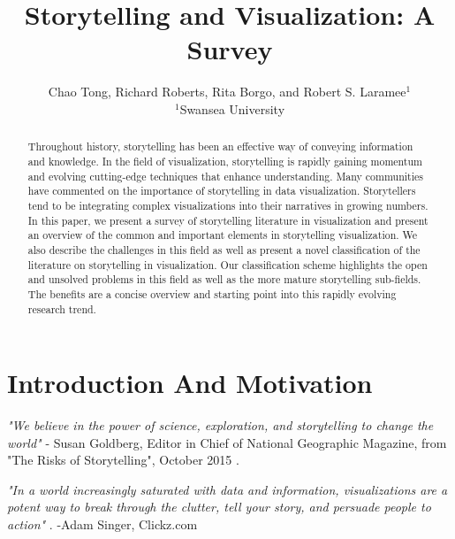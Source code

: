 \documentclass{egpubl}
\begin{document}
\title[Storytelling and Visualization: A Survey]%
      {Storytelling and Visualization: A Survey}

\author[C.Tong \& R.Roberts \& R.S.Laramee]
       {Chao Tong, Richard Roberts, Rita Borgo,
        and Robert S. Laramee$^{1}$

        $^1$Swansea University
       }

\maketitle
\begin{abstract}
Throughout history, storytelling has been an effective way of conveying information and knowledge. In the field of visualization, storytelling is rapidly gaining momentum and evolving cutting-edge techniques that enhance understanding. Many communities have commented on the importance of storytelling in data visualization. Storytellers tend to be integrating complex visualizations into their narratives in growing numbers. In this paper, we present a survey of storytelling literature in visualization and present an overview of the common and important elements in storytelling visualization. We also describe the challenges in this field as well as present a novel classification of the literature on storytelling in visualization. Our classification scheme highlights the open and unsolved problems in this field as well as the more mature storytelling sub-fields. The benefits are a concise overview and starting point into this rapidly evolving research trend.
\end{abstract}
\section{Introduction And Motivation}
\textit{"We believe in the power of science, exploration, and storytelling to change the world"} - Susan Goldberg, Editor in Chief of National Geographic Magazine, from "The Risks of Storytelling", October 2015 \cite{risks2015}. 

\textit{"In a world increasingly saturated with data and information, visualizations are a potent way to break through the clutter, tell your story, and persuade people to action"} \cite{adam2015}. -Adam Singer, Clickz.com
\end{document}
